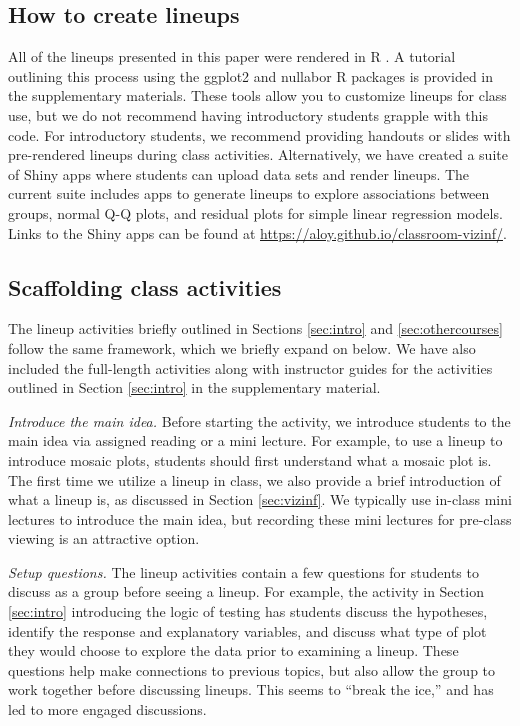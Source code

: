 \documentclass[12pt]{article}
\begin{document}
\label{sec:implement}

\hypertarget{how-to-create-lineups}{%
\subsection{How to create lineups}\label{how-to-create-lineups}}

All of the lineups presented in this paper were rendered in R \citep{r}.
A tutorial outlining this process using the ggplot2 \citep{ggplot2} and
nullabor \citep{nullabor} R packages is provided in the supplementary
materials. These tools allow you to customize lineups for class use, but
we do not recommend having introductory students grapple with this code.
For introductory students, we recommend providing handouts or slides
with pre-rendered lineups during class activities. Alternatively, we
have created a suite of Shiny apps \citep{shiny} where students can
upload data sets and render lineups. The current suite includes apps to
generate lineups to explore associations between groups, normal Q-Q
plots, and residual plots for simple linear regression models. Links to
the Shiny apps can be found at
\url{https://aloy.github.io/classroom-vizinf/}.

\hypertarget{scaffolding-class-activities}{%
\subsection{Scaffolding class
activities}\label{scaffolding-class-activities}}

The lineup activities briefly outlined in Sections \ref{sec:intro} and
\ref{sec:othercourses} follow the same framework, which we briefly
expand on below. We have also included the full-length activities along
with instructor guides for the activities outlined in Section
\ref{sec:intro} in the supplementary material.

\emph{Introduce the main idea.} Before starting the activity, we
introduce students to the main idea via assigned reading or a mini
lecture. For example, to use a lineup to introduce mosaic plots,
students should first understand what a mosaic plot is. The first time
we utilize a lineup in class, we also provide a brief introduction of
what a lineup is, as discussed in Section \ref{sec:vizinf}. We typically
use in-class mini lectures to introduce the main idea, but recording
these mini lectures for pre-class viewing is an attractive option.

\emph{Setup questions.} The lineup activities contain a few questions
for students to discuss as a group before seeing a lineup. For example,
the activity in Section \ref{sec:intro} introducing the logic of testing
has students discuss the hypotheses, identify the response and
explanatory variables, and discuss what type of plot they would choose
to explore the data prior to examining a lineup. These questions help
make connections to previous topics, but also allow the group to work
together before discussing lineups. This seems to ``break the ice,'' and
has led to more engaged discussions.
\end{document}
